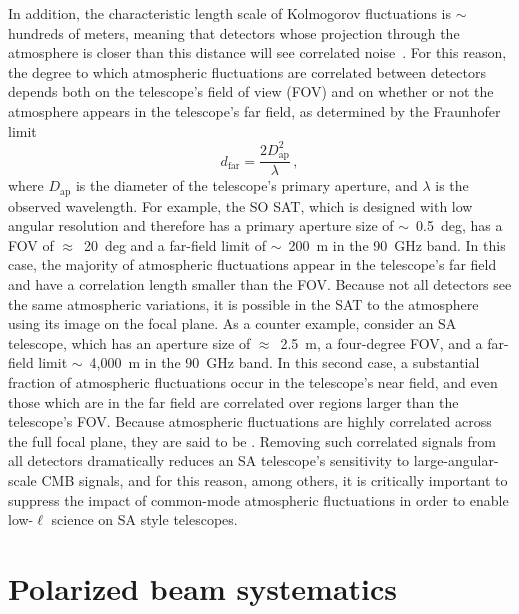 In addition, the characteristic length scale of Kolmogorov fluctuations is $\sim$hundreds of meters, meaning that detectors whose projection through the atmosphere is closer than this distance will see correlated noise~\cite{errard_modeling_2015}. For this reason, the degree to which atmospheric fluctuations are correlated between detectors depends both on the telescope's field of view (FOV) and on whether or not the atmosphere appears in the telescope's far field, as determined by the Fraunhofer limit
\begin{equation}
    d_{\mathrm{far}} = \frac{2 D_{\mathrm{ap}}^{2}}{\lambda} \, ,
    \label{eq:fraunhofer_far_field_limit}
\end{equation}
where $D_{\mathrm{ap}}$ is the diameter of the telescope's primary aperture, and $\lambda$ is the observed wavelength. For example, the SO SAT, which is designed with low angular resolution and therefore has a primary aperture size of $\sim$~0.5~deg, has a FOV of $\approx$~20~deg and a far-field limit of $\sim$~200~m in the 90~GHz band. In this case, the majority of atmospheric fluctuations appear in the telescope's far field and have a correlation length smaller than the FOV. Because not all detectors see the same atmospheric variations, it is possible in the SAT to  the atmosphere using its image on the focal plane. As a counter example, consider an SA telescope, which has an aperture size of $\approx$~2.5~m, a four-degree FOV, and a far-field limit $\sim$~4,000~m in the 90~GHz band. In this second case, a substantial fraction of atmospheric fluctuations occur in the telescope's near field, and even those which are in the far field are correlated over regions larger than the telescope's FOV. Because atmospheric fluctuations are highly correlated across the full focal plane, they are said to be . Removing such correlated signals from all detectors dramatically reduces an SA telescope's sensitivity to large-angular-scale CMB signals, and for this reason, among others, it is critically important to suppress the impact of common-mode atmospheric fluctuations in order to enable low-$\ell$ science on SA style telescopes.


\section{Polarized beam systematics}
\label{sec:polarized_beam_systematics}

